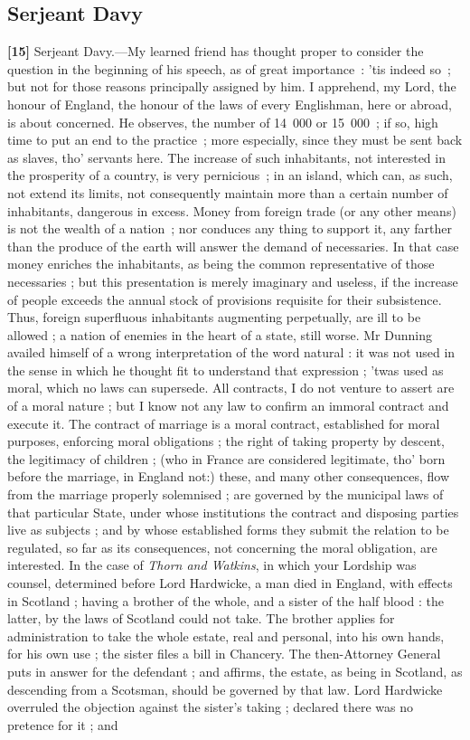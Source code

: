 \documentclass[a4paper]{article}
\begin{document}
\subsection{Serjeant Davy}
\textbf{[15]} Serjeant Davy.---My learned friend has thought proper to consider the question in the beginning of his speech, as of great importance~: 'tis indeed so~; but not for those reasons principally assigned by him. I apprehend, my Lord, the honour of England, the honour of the laws of every Englishman, here or abroad, is about concerned. He observes, the number of 14~000 or 15~000~; if so, high time to put an end to the practice~; more especially, since they must be sent back as slaves, tho' servants here. The increase of such inhabitants, not interested in the prosperity of  a country, is very pernicious~; in an island, which can, as such, not extend its limits, not consequently maintain more than a certain number of inhabitants, dangerous in excess. Money from foreign trade (or any other means) is not the wealth of a nation~; nor conduces any thing to support it, any farther than the produce of the earth will answer the demand of necessaries. In that case money enriches the inhabitants, as being the common representative of those necessaries ; but this presentation is merely imaginary and useless, if the increase of people exceeds the annual stock of provisions requisite for their subsistence. Thus, foreign superfluous inhabitants augmenting perpetually, are ill to be allowed ; a nation of enemies in the heart of a state, still worse. Mr Dunning availed himself of a wrong interpretation of the word natural : it was not used in the sense in which he thought fit to understand that expression ; 'twas used as moral, which no laws can supersede. All contracts, I do not venture to assert are of a moral nature ; but I know not any law to confirm an immoral contract and execute it. The contract of marriage is a moral contract, established for moral purposes, enforcing moral obligations ; the right of taking property by descent, the legitimacy of children ; (who in France are considered legitimate, tho' born before the marriage, in England not:) these, and many other consequences, flow from the marriage properly solemnised ; are governed by the municipal laws of that particular State, under whose institutions the contract and disposing parties live as subjects ; and by whose established forms they submit the relation to be regulated, so far as its consequences, not concerning the moral obligation, are interested. In the case of \emph{Thorn and Watkins}, in which your Lordship was counsel, determined before Lord Hardwicke, a man died in England, with effects in Scotland ; having a brother of the whole, and a sister of the half blood : the latter, by the laws of Scotland could not take. The brother applies for administration to take the whole estate, real and personal, into his own hands, for his own use ; the sister files a bill in Chancery. The then-Attorney General puts in answer for the defendant ; and affirms, the estate, as being in Scotland, as descending from a Scotsman, should be governed by that law. Lord Hardwicke overruled the objection against the sister's taking ; declared there was no pretence for it ; and 
\end{document}
